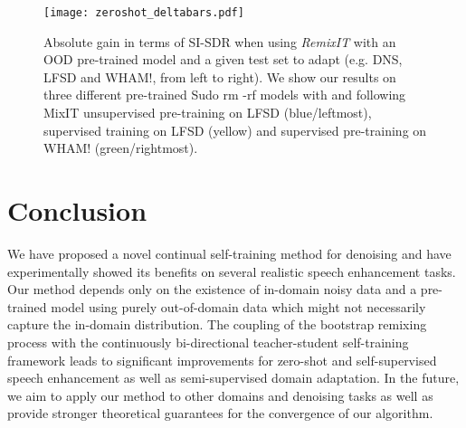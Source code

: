 \documentclass{article}
\begin{document}
\begin{figure}[ht]
    \centering
      \texttt{[image: zeroshot\_deltabars.pdf]}
      \caption{Absolute gain in terms of SI-SDR when using \textit{RemixIT} with an OOD pre-trained model and a given test set to adapt (e.g. DNS, LFSD and WHAM!, from left to right). We show our results on three different pre-trained Sudo rm -rf models with  and following MixIT unsupervised pre-training on LFSD (blue/leftmost), supervised training on LFSD (yellow) and supervised pre-training on WHAM! (green/rightmost).}
      \label{fig:zeroshot}
\end{figure}


\section{Conclusion}
\label{sec:conclusion}
We have proposed a novel continual self-training method for denoising and have experimentally showed its benefits on several realistic speech enhancement tasks. Our method depends only on the existence of in-domain noisy data and a pre-trained model using purely out-of-domain data which might not necessarily capture the in-domain distribution. The coupling of the bootstrap remixing process with the continuously bi-directional teacher-student self-training framework leads to significant improvements for zero-shot and self-supervised speech enhancement as well as semi-supervised domain adaptation. In the future, we aim to apply our method to other domains and denoising tasks as well as provide stronger theoretical guarantees for the convergence of our algorithm.











\end{document}
